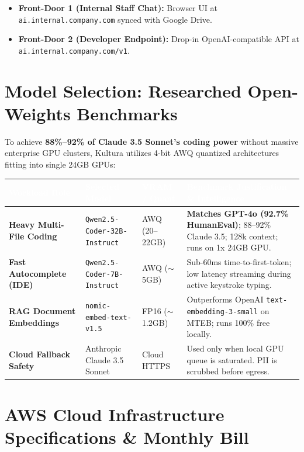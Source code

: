 \documentclass[10pt,a4paper]{article}
\begin{document}
\vspace{-4pt}
\begin{itemize}[leftmargin=12pt, itemsep=1pt]
    \item \textbf{Front-Door 1 (Internal Staff Chat):} Browser UI at \texttt{ai.internal.company.com} synced with Google Drive.
    \item \textbf{Front-Door 2 (Developer Endpoint):} Drop-in OpenAI-compatible API at \texttt{ai.internal.company.com/v1}.
\end{itemize}

\section{Model Selection: Researched Open-Weights Benchmarks}

To achieve \textbf{88\%--92\% of Claude 3.5 Sonnet's coding power} without massive enterprise GPU clusters, Kultura utilizes 4-bit AWQ quantized architectures fitting into single 24GB GPUs:

\vspace{4pt}
\begin{tabularx}{\textwidth}{l p{4.2cm} l X}
\toprule
\rowcolor{tableheader}
\textcolor{white}{\textbf{Workload Role}} & \textcolor{white}{\textbf{Selected Model}} & \textcolor{white}{\textbf{VRAM / Quant}} & \textcolor{white}{\textbf{Benchmark Justification \& Intelligence}} \\
\midrule
\textbf{Heavy Multi-File Coding} & \texttt{Qwen2.5-Coder-32B-Instruct} & AWQ (20--22GB) & \textbf{Matches GPT-4o (92.7\% HumanEval)}; 88--92\% Claude 3.5; 128k context; runs on 1x 24GB GPU. \\
\rowcolor{tablerowalt}
\textbf{Fast Autocomplete (IDE)} & \texttt{Qwen2.5-Coder-7B-Instruct} & AWQ ($\sim$5GB) & Sub-60ms time-to-first-token; low latency streaming during active keystroke typing. \\
\textbf{RAG Document Embeddings} & \texttt{nomic-embed-text-v1.5} & FP16 ($\sim$1.2GB) & Outperforms OpenAI \texttt{text-embedding-3-small} on MTEB; runs 100\% free locally. \\
\rowcolor{tablerowalt}
\textbf{Cloud Fallback Safety} & Anthropic Claude 3.5 Sonnet & Cloud HTTPS & Used only when local GPU queue is saturated. PII is scrubbed before egress. \\
\bottomrule
\end{tabularx}

\section{AWS Cloud Infrastructure Specifications \& Monthly Bill}
\end{document}
